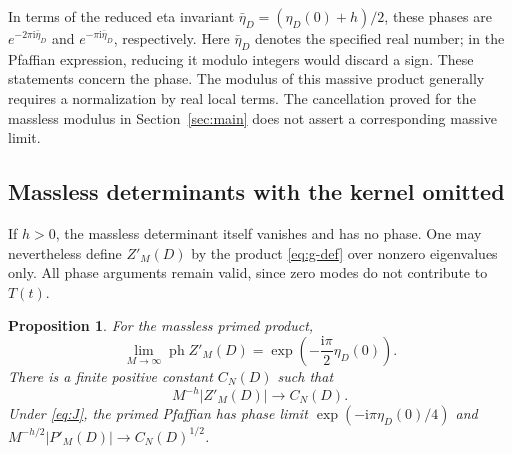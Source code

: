 \documentclass[11pt,a4paper]{article}
\newtheorem{proposition}[theorem]{Proposition}
\theoremstyle{remark}
\DeclareMathOperator{\ph}{ph}
\newcommand{\ii}{\mathrm i}
\numberwithin{equation}{section}
\begin{document}
In terms of the reduced eta invariant
$\bar\eta_D=(\eta_D(0)+h)/2$, these phases are
$e^{-2\pi\ii\bar\eta_D}$ and $e^{-\pi\ii\bar\eta_D}$, respectively.
Here $\bar\eta_D$ denotes the specified real number; in the Pfaffian
expression, reducing it modulo integers would discard a sign.
These statements concern the phase. The modulus of this massive
product generally requires a normalization by real local terms.
The cancellation proved for the massless modulus in
Section~\ref{sec:main} does not assert a corresponding massive limit.

\subsection{Massless determinants with the kernel omitted}

If $h>0$, the massless determinant itself vanishes and has no phase.
One may nevertheless define $Z'_M(D)$ by the product
\eqref{eq:g-def} over nonzero eigenvalues only. All phase arguments
remain valid, since zero modes do not contribute to $T(t)$.

\begin{proposition}\label{prop:primed}
For the massless primed product,
\begin{equation}\label{eq:primed-phase}
 \lim_{M\to\infty}\ph Z'_M(D)
 =\exp\!\left(-\frac{\ii\pi}{2}\eta_D(0)\right).
\end{equation}
There is a finite positive constant $C_N(D)$ such that
\begin{equation}\label{eq:primed-modulus}
 M^{-h}|Z'_M(D)|\longrightarrow C_N(D).
\end{equation}
Under \eqref{eq:J}, the primed Pfaffian has phase limit
$\exp(-\ii\pi\eta_D(0)/4)$ and
$M^{-h/2}|P'_M(D)|\to C_N(D)^{1/2}$.
\end{proposition}
\end{document}
